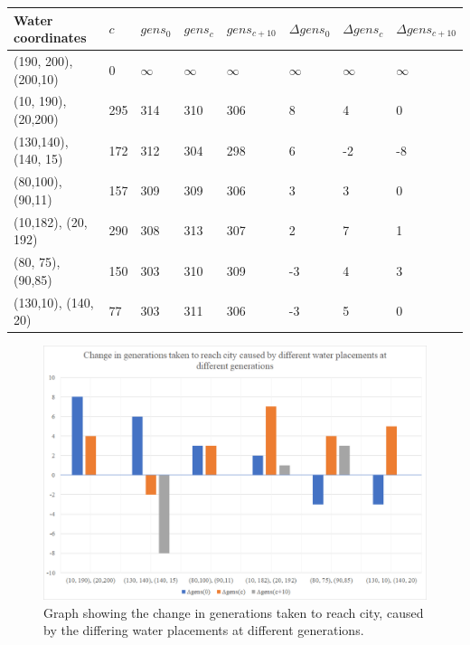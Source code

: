 \documentclass[11pt, a4paper, titlepage]{article}
\begin{document}
      \begin{table}[H]
        \begin{tabular}{|l|l|l|l|l|l|l|l|}
        \hline
        Water coordinates    &  $c$ & $gens_0$ & $gens_{c}$ & $gens_{c+10}$ & $\Delta gens_0$ & $\Delta gens_c$ & $\Delta gens_{c+10}$ \\ \hline
        (190, 200), (200,10) & 0   & $\infty$     & $\infty$       & $\infty$         & $\infty$        & $\infty$        & $\infty$           \\ \hline
        (10, 190), (20,200)  & 295 & 314   & 310     & 306       & 8        & 4        & 0           \\ \hline
        (130,140), (140, 15) & 172 & 312   & 304     & 298       & 6        & -2       & -8          \\ \hline
        (80,100),(90,11)     & 157 & 309   & 309     & 306       & 3        & 3        & 0           \\ \hline
        (10,182), (20, 192)  & 290 & 308   & 313     & 307       & 2        & 7        & 1           \\ \hline
        (80, 75), (90,85)    & 150 & 303   & 310     & 309       & -3       & 4        & 3           \\ \hline
        (130,10), (140, 20)  & 77  & 303   & 311     & 306       & -3       & 5        & 0           \\ \hline
        \end{tabular}
        \end{table}

        \begin{figure}[h]
          \centering
            \includegraphics[width=\linewidth]{imgs/graphs/water_gens.png}
          \caption{Graph showing the change in generations taken to reach city, caused by the differing water placements at different generations.}
          \label{}
        \end{figure}
\end{document}
